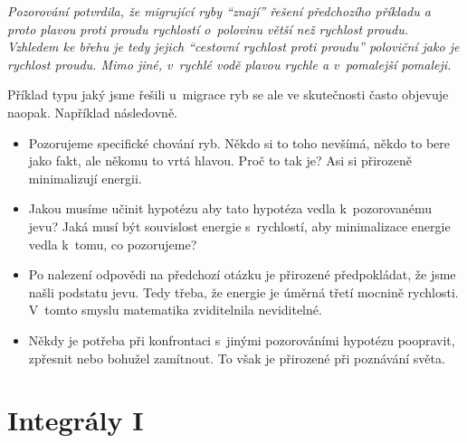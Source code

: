 {\itshape\footnotesize 
Pozorování potvrdila, že migrující ryby ``znají'' řešení předchozího
příkladu a proto plavou proti proudu rychlostí o polovinu větší než
rychlost proudu. Vzhledem ke břehu je tedy jejich ``cestovní rychlost
proti proudu'' poloviční jako je rychlost proudu. Mimo jiné, v rychlé
vodě plavou rychle a v pomalejší pomaleji.

Příklad typu jaký jsme řešili u migrace ryb se ale ve skutečnosti
často objevuje naopak. Například následovně.

\begin{itemize}
\item Pozorujeme specifické chování ryb. Někdo si to toho nevšímá,
  někdo to bere jako fakt, ale někomu to vrtá hlavou. Proč to tak je?
  Asi si přirozeně minimalizují energii.
\item Jakou musíme učinit hypotézu aby tato hypotéza vedla k pozorovanému jevu? Jaká musí být souvislost energie s rychlostí, aby
  minimalizace energie vedla k tomu, co pozorujeme?
\item Po nalezení odpovědi na předchozí otázku je přirozené
  předpokládat, že jsme našli podstatu jevu. Tedy třeba, že energie je
  úměrná třetí mocnině rychlosti. V tomto smyslu matematika
  zviditelnila neviditelné.
\item Někdy je potřeba při konfrontaci s jinými pozorováními hypotézu
  poopravit, zpřesnit nebo bohužel zamítnout. To však je přirozené při
  poznávání světa.
\end{itemize}

}


%


\stranka
\section{Integrály I}




